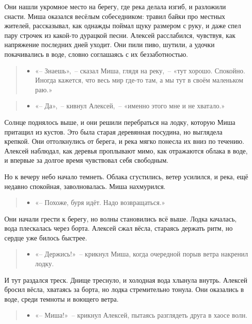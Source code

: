 \documentclass[12pt,a4paper]{book}
\newenvironment{dialogue}{\begin{quote}\itshape\begin{itemize}\item[]}{\end{itemize}\end{quote}}
\begin{document}
Они нашли укромное место на берегу, где река делала изгиб, и разложили снасти. Миша оказался весёлым собеседником: травил байки про местных жителей, рассказывал, как однажды поймал щуку размером с руку, и даже спел пару строчек из какой-то дурацкой песни. Алексей расслабился, чувствуя, как напряжение последних дней уходит. Они пили пиво, шутили, а удочки покачивались в воде, словно соглашаясь с их беззаботностью.

\begin{dialogue}
«-- Знаешь»,~-- сказал Миша, глядя на реку,~-- «тут хорошо. Спокойно. Иногда кажется, что весь мир где-то там, а мы тут в своём маленьком раю.»
\end{dialogue}

\begin{dialogue}
«-- Да»,~-- кивнул Алексей,~-- «именно этого мне и не хватало.»
\end{dialogue}

Солнце поднялось выше, и они решили перебраться на лодку, которую Миша притащил из кустов. Это была старая деревянная посудина, но выглядела крепкой. Они оттолкнулись от берега, и река мягко понесла их вниз по течению. Алексей наблюдал, как деревья проплывают мимо, как отражаются облака в воде, и впервые за долгое время чувствовал себя свободным.

Но к вечеру небо начало темнеть. Облака сгустились, ветер усилился, и река, ещё недавно спокойная, заволновалась. Миша нахмурился.

\begin{dialogue}
«-- Похоже, буря идёт. Надо возвращаться.»
\end{dialogue}

Они начали грести к берегу, но волны становились всё выше. Лодка качалась, вода плескалась через борта. Алексей сжал вёсла, стараясь держать ритм, но сердце уже билось быстрее.

\begin{dialogue}
«-- Держись!»~-- крикнул Миша, когда очередной порыв ветра накренил лодку.
\end{dialogue}

И тут раздался треск. Днище треснуло, и холодная вода хлынула внутрь. Алексей бросил вёсла, хватаясь за борта, но лодка стремительно тонула. Они оказались в воде, среди темноты и воющего ветра.

\begin{dialogue}
«-- Миша!»~-- крикнул Алексей, пытаясь разглядеть друга в хаосе волн.
\end{dialogue}
\end{document}

